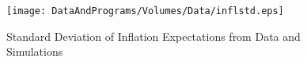 \begin{figure}
 \centerline{\texttt{[image: DataAndPrograms/Volumes/Data/inflstd.eps]}}%
 \caption{Standard Deviation of Inflation Expectations from Data and Simulations}
 \label{fig:inflstd}
\end{figure}
